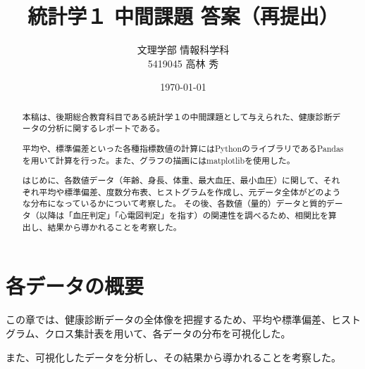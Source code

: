 \documentclass[dvipdfmx]{jsarticle}
\title{統計学１ 中間課題 答案（再提出）}
\author{文理学部 情報科学科\\5419045 高林 秀}
\date{\today}
\begin{document}
\maketitle

\begin{abstract}
    本稿は、後期総合教育科目である統計学１の中間課題として与えられた、健康診断データの分析に関するレポートである。\par 
    平均や、標準偏差といった各種指標数値の計算にはPythonのライブラリであるPandasを用いて計算を行った。また、グラフの描画にはmatplotlibを使用した。\par 
    はじめに、各数値データ（年齢、身長、体重、最大血圧、最小血圧）に関して、それぞれ平均や標準偏差、度数分布表、ヒストグラムを作成し、元データ全体がどのような分布になっているかについて考察した。 
    その後、各数値（量的）データと質的データ（以降は「血圧判定」「心電図判定」を指す）の関連性を調べるため、相関比を算出し、結果から導かれることを考察した。
\end{abstract}

\tableofcontents
\newpage
\section{各データの概要}

    この章では、健康診断データの全体像を把握するため、平均や標準偏差、ヒストグラム、クロス集計表を用いて、各データの分布を可視化した。\par
    また、可視化したデータを分析し、その結果から導かれることを考察した。
\end{document}
